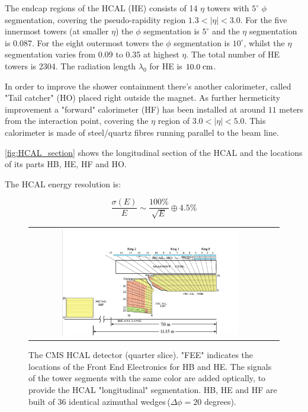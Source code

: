The endcap regions of the HCAL (HE) consists of 14 $\eta$ towers with $5^{\circ}$ $\phi$ segmentation, covering the pseudo-rapidity region $1.3 < |\eta| < 3.0$. For the five innermost towers (at smaller $\eta$) the $\phi$ segmentation is $5^{\circ}$ and the $\eta$ segmentation is 0.087. For the eight outermost towers the $\phi$ segmentation is $10^{\circ}$, whilst the $\eta$ segmentation varies from 0.09 to 0.35 at highest $\eta$. The total number of HE towers is 2304. The radiation length $\lambda_{0}$ for HE is $10.0\;\text{cm}$.

In order to improve the shower containment there's another calorimeter, called "Tail catcher" (HO) placed right outside the magnet. As further hermeticity improvement a "forward" calorimeter (HF) has been installed at around $11$ meters from the interaction point, covering the $\eta$ region of $3.0 < |\eta| <5.0$. This calorimeter is made of steel/quartz fibres running parallel to the beam line.

\autoref{fig:HCAL_section} shows the longitudinal section of the HCAL and the locations of its parts HB, HE, HF and HO.

The HCAL energy resolution is:

\begin{equation}
\dfrac{\sigma(E)}{E} \sim \dfrac{100\%}{\sqrt{E}}\oplus 4.5\%
\end{equation}

\begin{figure}[tbh!]
	\centering
	\begin{tabular}{cc}
		\includegraphics[width=0.75\textwidth]{detector/pics/HCAL_section.png}
	\end{tabular}
	\caption{The CMS HCAL detector (quarter slice). "FEE" indicates the locations of the Front End Electronics for HB and HE. The signals of the tower segments with the same color are added optically, to provide the HCAL "longitudinal" segmentation. HB, HE and HF are built of 36 identical azimuthal wedges\,($\Delta\phi = 20$ degrees).}
	\label{fig:HCAL_section}
\end{figure}

